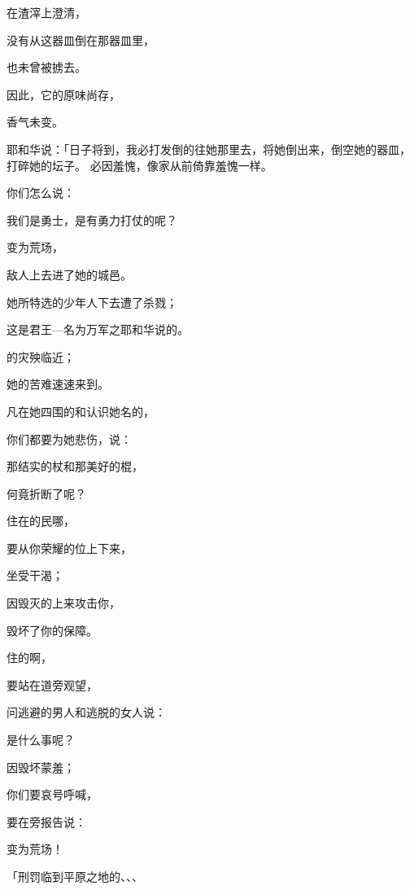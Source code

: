 {\par }{在渣滓上澄清，
\par }{\Q 没有从这器皿倒在那器皿里，
\par }{\Q 也未曾被掳去。
\par }{\Q 因此，它的原味尚存，
\par }{\Q 香气未变。
\par }{\PP {}耶和华说：「日子将到，我必打发倒{}的往她那里去，将她倒出来，倒空她的器皿，打碎她的坛子。
必因{}羞愧，像{}家从前倚靠{}{}羞愧一样。
\par }{\Q {}你们怎么说：
\par }{\Q 我们是勇士，是有勇力打仗的呢？
\par }{\Q {}变为荒场，
\par }{\Q 敌人上去进了她的城邑。
\par }{\Q 她所特选的少年人下去遭了杀戮；
\par }{\Q 这是君王—名为万军之耶和华说的。
\par }{\Q {}的灾殃临近；
\par }{\Q 她的苦难速速来到。
\par }{\Q {}凡在她四围的和认识她名的，
\par }{\Q 你们都要为她悲伤，说：
\par }{\Q 那结实的杖和那美好的棍，
\par }{\Q 何竟折断了呢？
\par }{\BB \par }{\Q {}住在{}的民哪，
\par }{\Q 要从你荣耀的位上下来，
\par }{\Q 坐受干渴；
\par }{\Q 因毁灭{}的上来攻击你，
\par }{\Q 毁坏了你的保障。
\par }{\Q {}住{}的啊，
\par }{\Q 要站在道旁观望，
\par }{\Q 问逃避的男人和逃脱的女人说：
\par }{\Q 是什么事呢？
\par }{\Q {}因毁坏蒙羞；
\par }{\Q 你们要哀号呼喊，
\par }{\Q 要在{}旁报告说：
\par }{变为荒场！
\par }{\PP {}「刑罚临到平原之地的{}、{}、{}、
}
